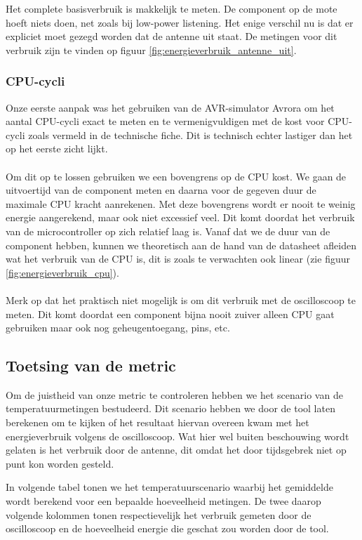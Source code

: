 \documentclass[11pt]{article}
\begin{document}
Het complete basisverbruik is makkelijk te meten. De component op de mote hoeft
niets doen, net zoals bij low-power listening. Het enige verschil nu is dat er
expliciet moet gezegd worden dat de antenne uit staat.
De metingen voor dit verbruik zijn te vinden op figuur \ref{fig:energieverbruik_antenne_uit}.

\subsubsection{CPU-cycli}

Onze eerste aanpak was het gebruiken van de AVR-simulator Avrora
\cite{titzer2005avrora} om het aantal CPU-cycli exact te meten en te
vermenigvuldigen met de kost voor CPU-cycli zoals vermeld in de technische
fiche. Dit is technisch echter lastiger dan het op het eerste zicht lijkt.
\\
\\
Om dit op te lossen gebruiken we een bovengrens op de CPU kost. We gaan de
uitvoertijd van de component meten en daarna voor de gegeven duur de maximale
CPU kracht aanrekenen. Met deze bovengrens wordt er nooit te weinig energie
aangerekend, maar ook niet excessief veel. Dit komt doordat het verbruik van de
microcontroller op zich relatief laag is. Vanaf dat we de duur van de
component hebben, kunnen we theoretisch aan de hand van de datasheet afleiden
wat het verbruik van de CPU is, dit is zoals te verwachten ook linear (zie figuur
\ref{fig:energieverbruik_cpu}).\\
\\
Merk op dat het praktisch niet mogelijk is om dit verbruik met de oscilloscoop te meten.
Dit komt doordat een component bijna nooit zuiver alleen CPU gaat gebruiken maar ook nog geheugentoegang, pins, etc. 

\subsection{Toetsing van de metric}

Om de juistheid van onze metric te controleren hebben we het scenario van de
temperatuurmetingen bestudeerd. Dit scenario hebben we door de tool laten
berekenen om te kijken of het resultaat hiervan overeen kwam met het
energieverbruik volgens de oscilloscoop. Wat hier wel buiten beschouwing
wordt gelaten is het verbruik door de antenne, dit omdat het door tijdsgebrek niet op punt kon worden gesteld.

In volgende tabel tonen we het temperatuurscenario waarbij het gemiddelde wordt
berekend voor een bepaalde hoeveelheid metingen. De twee daarop volgende
kolommen tonen respectievelijk het verbruik gemeten door de oscilloscoop en de
hoeveelheid energie die geschat zou worden door de tool.
\end{document}

